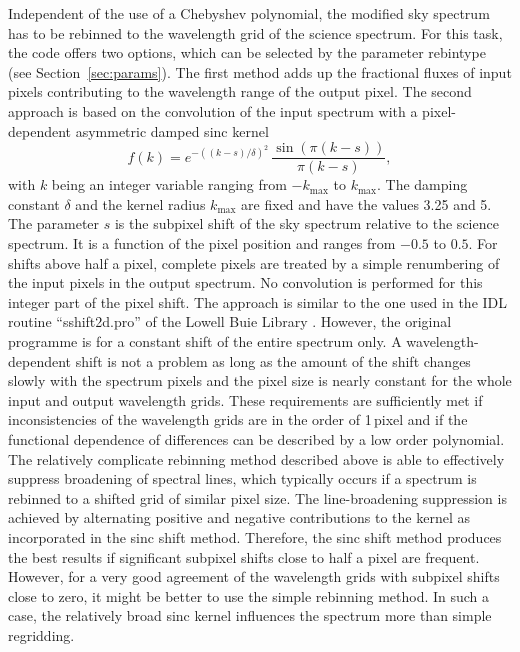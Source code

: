 Independent of the use of a Chebyshev polynomial, the modified sky spectrum has
to be rebinned to the wavelength grid of the science spectrum. For this task,
the code offers two options, which can be selected by the parameter
{\sc rebintype} (see Section~\ref{sec:params}). The first method adds up the
fractional fluxes of input pixels contributing to the wavelength range of the
output pixel. The second approach is based on the convolution of the input
spectrum with a pixel-dependent asymmetric damped sinc kernel
\begin{equation}
f(k) = e^{-((k - s) / \delta)^2} \, \frac{\sin(\pi (k - s))}{\pi (k - s)},
\end{equation}
with $k$ being an integer variable ranging from $-k_\mathrm{max}$ to
$k_\mathrm{max}$. The damping constant $\delta$ and the kernel radius
$k_\mathrm{max}$ are fixed and have the values 3.25 and 5. The parameter $s$ is
the subpixel shift of the sky spectrum relative to the science spectrum. It is
a function of the pixel position and ranges from $-0.5$ to $0.5$. For shifts
above half a pixel, complete pixels are treated by a simple renumbering of the
input pixels in the output spectrum. No convolution is performed for this
integer part of the pixel shift. The approach is similar to the one used in the
IDL routine ``sshift2d.pro'' of the Lowell Buie Library \cite{SINC}. However,
the original programme is for a constant shift of the entire spectrum only. A
wavelength-dependent shift is not a problem as long as the amount of the shift
changes slowly with the spectrum pixels and the pixel size is nearly constant
for the whole input and output wavelength grids. These requirements are
sufficiently met if inconsistencies of the wavelength grids are in the order of
1\,pixel and if the functional dependence of differences can be described by a
low order polynomial. The relatively complicate rebinning method described
above is able to effectively suppress broadening of spectral lines, which
typically occurs if a spectrum is rebinned to a shifted grid of similar pixel
size. The line-broadening suppression is achieved by alternating positive and
negative contributions to the kernel as incorporated in the sinc shift method.
Therefore, the sinc shift method produces the best results if significant
subpixel shifts close to half a pixel are frequent. However, for a very good
agreement of the wavelength grids with subpixel shifts close to zero, it might
be better to use the simple rebinning method. In such a case, the relatively
broad sinc kernel influences the spectrum more than simple regridding.
